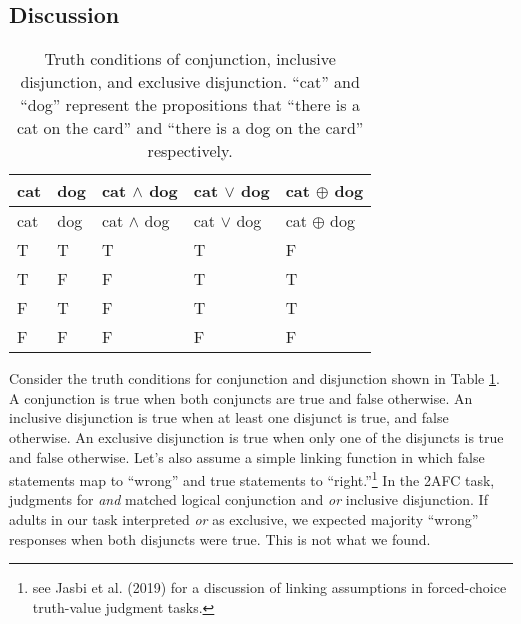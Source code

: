 \documentclass[,man,floatsintext]{apa6}
\let\rmarkdownfootnote\footnote%
\def\footnote{\protect\rmarkdownfootnote}
\begin{document}
\hypertarget{discussion}{%
\subsection{Discussion}\label{discussion}}

\begin{longtable}[]{@{}lllll@{}}
\caption{\label{tab:truthtable} Truth conditions of conjunction, inclusive disjunction, and exclusive disjunction. \enquote{cat} and \enquote{dog} represent the propositions that \enquote{there is a cat on the card} and \enquote{there is a dog on the card} respectively.}\tabularnewline
\toprule
cat & dog & cat \(\land\) dog & cat \(\lor\) dog & cat \(\oplus\) dog\tabularnewline
\midrule
\endfirsthead
\toprule
cat & dog & cat \(\land\) dog & cat \(\lor\) dog & cat \(\oplus\) dog\tabularnewline
\midrule
\endhead
T & T & T & T & F\tabularnewline
T & F & F & T & T\tabularnewline
F & T & F & T & T\tabularnewline
F & F & F & F & F\tabularnewline
\bottomrule
\end{longtable}

Consider the truth conditions for conjunction and disjunction shown in Table \ref{tab:truthtable}. A conjunction is true when both conjuncts are true and false otherwise. An inclusive disjunction is true when at least one disjunct is true, and false otherwise. An exclusive disjunction is true when only one of the disjuncts is true and false otherwise. Let's also assume a simple linking function in which false statements map to \enquote{wrong} and true statements to \enquote{right.}\footnote{see Jasbi et al. (2019) for a discussion of linking assumptions in forced-choice truth-value judgment tasks.} In the 2AFC task, judgments for \emph{and} matched logical conjunction and \emph{or} inclusive disjunction. If adults in our task interpreted \emph{or} as exclusive, we expected majority \enquote{wrong} responses when both disjuncts were true. This is not what we found.
\end{document}
